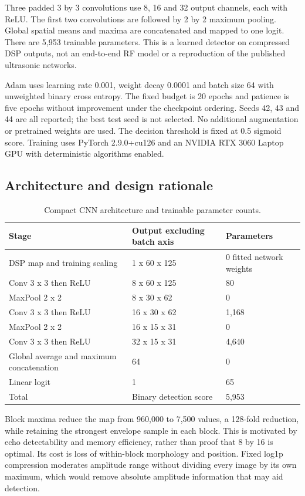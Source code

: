 \documentclass[11pt,a4paper]{article}
\begin{document}
Three padded 3 by 3 convolutions use 8, 16 and 32 output channels, each with ReLU. The first two convolutions are followed by 2 by 2 maximum pooling. Global spatial means and maxima are concatenated and mapped to one logit. There are 5,953 trainable parameters. This is a learned detector on compressed DSP outputs, not an end-to-end RF model or a reproduction of the published ultrasonic networks.

Adam uses learning rate 0.001, weight decay 0.0001 and batch size 64 with unweighted binary cross entropy. The fixed budget is 20 epochs and patience is five epochs without improvement under the checkpoint ordering. Seeds 42, 43 and 44 are all reported; the best test seed is not selected. No additional augmentation or pretrained weights are used. The decision threshold is fixed at 0.5 sigmoid score. Training uses PyTorch 2.9.0+cu126 and an NVIDIA RTX 3060 Laptop GPU with deterministic algorithms enabled.

\subsection{Architecture and design rationale}

\begin{table}[H]
\centering
\caption{Compact CNN architecture and trainable parameter counts.}
\label{tab:2}
\small
\setlength{\tabcolsep}{4pt}
\begin{tabularx}{\linewidth}{@{}YYY@{}}
\toprule
{}
\textbf{Stage} & \textbf{Output excluding batch axis} & \textbf{Parameters} \\
\midrule
DSP map and training scaling & 1 x 60 x 125 & 0 fitted network weights \\
Conv 3 x 3 then ReLU & 8 x 60 x 125 & 80 \\
MaxPool 2 x 2 & 8 x 30 x 62 & 0 \\
Conv 3 x 3 then ReLU & 16 x 30 x 62 & 1,168 \\
MaxPool 2 x 2 & 16 x 15 x 31 & 0 \\
Conv 3 x 3 then ReLU & 32 x 15 x 31 & 4,640 \\
Global average and maximum concatenation & 64 & 0 \\
Linear logit & 1 & 65 \\
Total & Binary detection score & 5,953 \\
\bottomrule
\end{tabularx}
\end{table}

Block maxima reduce the map from 960,000 to 7,500 values, a 128-fold reduction, while retaining the strongest envelope sample in each block. This is motivated by echo detectability and memory efficiency, rather than proof that 8 by 16 is optimal. Its cost is loss of within-block morphology and position. Fixed log1p compression moderates amplitude range without dividing every image by its own maximum, which would remove absolute amplitude information that may aid detection.
\end{document}
